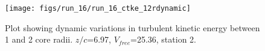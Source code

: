 \begin{figure}[H]
\centering
\texttt{[image: figs/run\_16/run\_16\_ctke\_12rdynamic]}
\caption{Plot showing dynamic variations in turbulent kinetic energy between 1 and 2 core radii. $z/c$=6.97, $V_{free}$=25.36, station 2.}
\label{fig:run_16_ctke_12rdynamic}
\end{figure}


